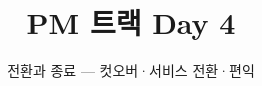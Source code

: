 \documentclass[aspectratio=169,11pt,t]{beamer}
\title{PM 트랙 Day 4}
\subtitle{전환과 종료 — 컷오버·서비스 전환·편익}
\begin{document}
\begin{frame}[plain,c]
\titlepage
\end{frame}

\end{document}

